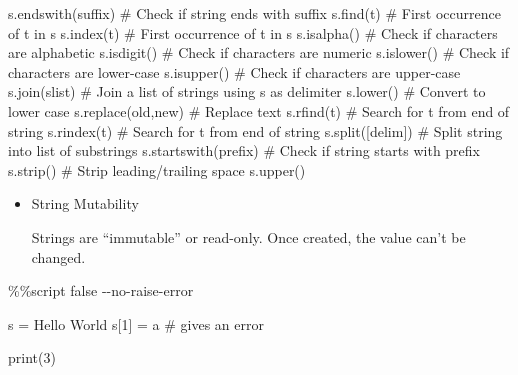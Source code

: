 \documentclass[
  letterpaper,
  DIV=11,
  numbers=noendperiod]{scrreprt}
\newenvironment{Shaded}{\begin{snugshade}}{\end{snugshade}}
\newcommand{\BuiltInTok}[1]{\textcolor[rgb]{0.00,0.46,0.62}{#1}}
\newcommand{\BuiltInTok}[1]{\textcolor[rgb]{0.00,0.48,0.65}{#1}}
\newcommand{\CommentTok}[1]{\textcolor[rgb]{0.37,0.37,0.37}{#1}}
\newcommand{\ControlFlowTok}[1]{\textcolor[rgb]{0.00,0.46,0.62}{#1}}
\newcommand{\ControlFlowTok}[1]{\textcolor[rgb]{0.00,0.48,0.65}{#1}}
\newcommand{\DecValTok}[1]{\textcolor[rgb]{0.68,0.00,0.00}{#1}}
\newcommand{\NormalTok}[1]{\textcolor[rgb]{0.00,0.46,0.62}{#1}}
\newcommand{\OperatorTok}[1]{\textcolor[rgb]{0.37,0.37,0.37}{#1}}
\newcommand{\NormalTok}[1]{\textcolor[rgb]{0.00,0.48,0.65}{#1}}
\newcommand{\OperatorTok}[1]{\textcolor[rgb]{0.37,0.37,0.37}{#1}}
\newcommand{\StringTok}[1]{\textcolor[rgb]{0.13,0.47,0.30}{#1}}
\begin{document}
\begin{Shaded}
\begin{Highlighting}[]
\begin{Shaded}
\begin{Highlighting}[]
\NormalTok{s.endswith(suffix)     }\CommentTok{\# Check if string ends with suffix}
\NormalTok{s.find(t)              }\CommentTok{\# First occurrence of t in s}
\NormalTok{s.index(t)             }\CommentTok{\# First occurrence of t in s}
\NormalTok{s.isalpha()            }\CommentTok{\# Check if characters are alphabetic}
\NormalTok{s.isdigit()            }\CommentTok{\# Check if characters are numeric}
\NormalTok{s.islower()            }\CommentTok{\# Check if characters are lower{-}case}
\NormalTok{s.isupper()            }\CommentTok{\# Check if characters are upper{-}case}
\NormalTok{s.join(slist)          }\CommentTok{\# Join a list of strings using s as delimiter}
\NormalTok{s.lower()              }\CommentTok{\# Convert to lower case}
\NormalTok{s.replace(old,new)     }\CommentTok{\# Replace text}
\NormalTok{s.rfind(t)             }\CommentTok{\# Search for t from end of string}
\NormalTok{s.rindex(t)            }\CommentTok{\# Search for t from end of string}
\NormalTok{s.split([delim])       }\CommentTok{\# Split string into list of substrings}
\NormalTok{s.startswith(prefix)   }\CommentTok{\# Check if string starts with prefix}
\NormalTok{s.strip()              }\CommentTok{\# Strip leading/trailing space}
\NormalTok{s.upper()  }
\end{Highlighting}
\end{Shaded}

\begin{itemize}
\item
  String Mutability

  Strings are ``immutable'' or read-only. Once created, the value can't
  be changed.
\end{itemize}

\begin{Shaded}
\begin{Highlighting}[]
\OperatorTok{\%\%}\NormalTok{script false }\OperatorTok{{-}{-}}\NormalTok{no}\OperatorTok{{-}}\ControlFlowTok{raise}\OperatorTok{{-}}\NormalTok{error}

\NormalTok{s }\OperatorTok{=} \StringTok{\textquotesingle{}Hello World\textquotesingle{}}
\NormalTok{s[}\DecValTok{1}\NormalTok{] }\OperatorTok{=} \StringTok{\textquotesingle{}a\textquotesingle{}} \CommentTok{\# gives an error}
\end{Highlighting}
\end{Shaded}

\begin{Shaded}
\begin{Highlighting}[]
\BuiltInTok{print}\NormalTok{(}\DecValTok{3}\NormalTok{)}
\end{Highlighting}
\end{Shaded}


\end{Highlighting}
\end{Shaded}
\end{document}

